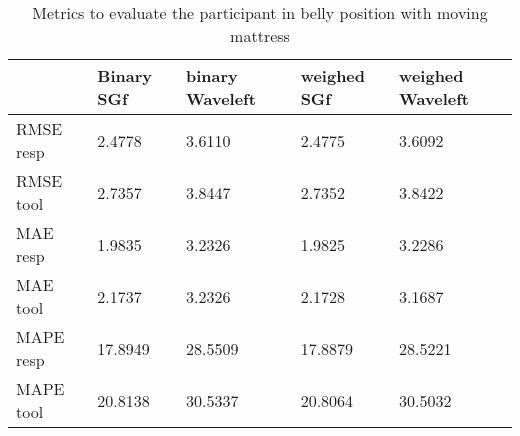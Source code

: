 \begin{table}
\begin{tabular}{|lllll|}
\hline 
& Binary SGf & binary Waveleft & weighed  SGf & weighed Waveleft \\ 
 
\hline 
RMSE resp &
    2.4778  &  3.6110  &  2.4775  &  3.6092 \\
RMSE  tool &  2.7357  &  3.8447  &  2.7352  &  3.8422 \\
MAE resp & 1.9835 &   3.2326 &     1.9825 &  3.2286 \\ 
MAE tool &     2.1737 & 3.2326 & 2.1728 &  3.1687 \\ 
MAPE resp & 17.8949 & 28.5509 & 17.8879 & 28.5221 \\ 
MAPE tool & 20.8138 & 30.5337 & 20.8064 & 30.5032 \\ 
\hline 
\end{tabular}

\caption{Metrics to evaluate the participant in belly position with moving mattress}
\end{table}

